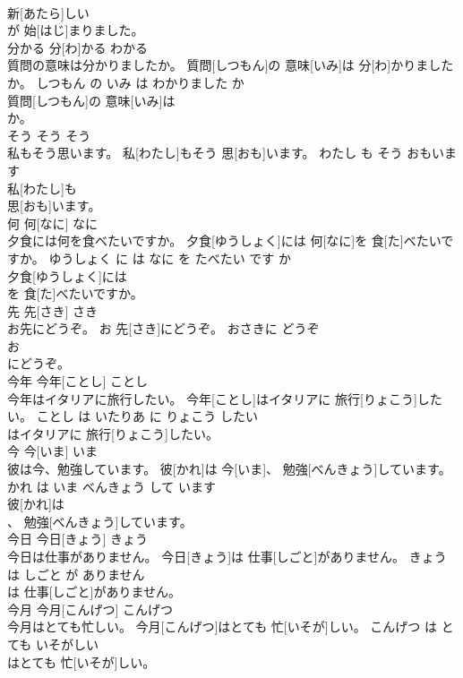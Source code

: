 \documentclass[8pt]{extreport}
\begin{document}
\begin{CJK}{UTF8}{min}
\\	新[あたら]しい
\\	が 始[はじ]まりました。		
\\	分かる	分[わ]かる	わかる	
\\	質問の意味は分かりましたか。	質問[しつもん]の 意味[いみ]は 分[わ]かりましたか。	しつもん の いみ は わかりました か	
\\	質問[しつもん]の 意味[いみ]は
\\	か。		
\\	そう	そう	そう	
\\	私もそう思います。	私[わたし]もそう 思[おも]います。	わたし も そう おもいます	
\\	私[わたし]も
\\	思[おも]います。		
\\	何	何[なに]	なに	
\\	夕食には何を食べたいですか。	夕食[ゆうしょく]には 何[なに]を 食[た]べたいですか。	ゆうしょく に は なに を たべたい です か	
\\	夕食[ゆうしょく]には
\\	を 食[た]べたいですか。		
\\	先	先[さき]	さき	
\\	お先にどうぞ。	お 先[さき]にどうぞ。	おさきに どうぞ	
\\	お
\\	にどうぞ。		
\\	今年	今年[ことし]	ことし	
\\	今年はイタリアに旅行したい。	今年[ことし]はイタリアに 旅行[りょこう]したい。	ことし は いたりあ に りょこう したい	
\\	はイタリアに 旅行[りょこう]したい。		
\\	今	今[いま]	いま	
\\	彼は今、勉強しています。	彼[かれ]は 今[いま]、 勉強[べんきょう]しています。	かれ は いま べんきょう して います	
\\	彼[かれ]は
\\	、 勉強[べんきょう]しています。		
\\	今日	今日[きょう]	きょう	
\\	今日は仕事がありません。	今日[きょう]は 仕事[しごと]がありません。	きょう は しごと が ありません	
\\	は 仕事[しごと]がありません。		
\\	今月	今月[こんげつ]	こんげつ	
\\	今月はとても忙しい。	今月[こんげつ]はとても 忙[いそが]しい。	こんげつ は とても いそがしい	
\\	はとても 忙[いそが]しい。		

\end{CJK}
\end{document}
